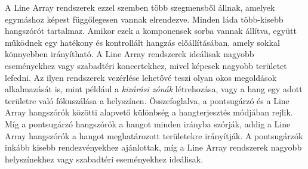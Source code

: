 A Line Array rendszerek ezzel szemben több szegmensből állnak, amelyek egymáshoz képest függőlegesen vannak elrendezve.
Minden láda több-kisebb hangszórót tartalmaz. Amikor ezek a komponensek sorba vannak állítva, 
együtt működnek egy hatékony és kontrollált hangzás előállításában, amely sokkal könnyebben irányítható. 
A Line Array rendszerek ideálisak nagyobb eseményekhez vagy szabadtéri koncertekhez, mivel képesek 
nagyobb területet lefedni. Az ilyen rendszerek vezérlése lehetővé 
teszi olyan okos megoldások alkalmazását is, mint például a \textit{kizárási zónák} létrehozása, vagy a 
hang egy adott területre való fókuszálása a helyszínen.
Összefoglalva, a pontsugárzó és a Line Array hangszórók közötti alapvető különbség a hangterjesztés módjában rejlik. 
Míg a pontsugárzó hangszórók a hangot minden irányba szórják, addig a Line Array hangszórók a hangot meghatározott területekre irányítják. 
A pontsugárzók inkább kisebb rendezvényekhez ajánlottak, míg a Line Array rendszerek nagyobb helyszínekhez vagy szabadtéri eseményekhez ideálisak.
